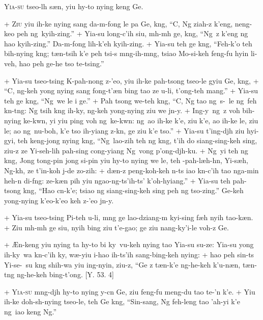 \header
\lettrine{Y}{ia-su} tseo-l\oo h s\ae n, yiu hy\y-to nying keng Ge.
\par
\hspace{1ex}
+	\textsc{Ziu} yiu ih-ke nying sang da-m\oo-fong le pa Ge, k\oo ng, ``C\y, Ng ziah-z k'eng, neng-keo peh ng\oo\ kyih-zing.''
+	Yia-su long-c'ih siu, m\oo h-m\oo h ge, k\oo ng, ``Ng\oo\ z k'eng ng hao kyih-zing.'' Da-m\oo-fong lih-k'eh kyih-zing.
+	Yia-su teh ge k\oo ng, ``Feh-k'o teh bih-nying k\oo ng; t\ae n-tsih k'e peh tsi-s m\oo ng-ih-m\oo ng, tsiao Mo-si-keh feng-fu hyin li-veh, hao peh ge-he tso te-tsing.''
\par
+	Yia-su tseo-tsing K\oo-pah-nong z-'eo, yiu ih-ke pah-tsong tseo-le gyiu Ge, k\oo ng,
+	``C\y, ng\oo-keh y\y ong nying sang fong-t'\ae n bing tao ze u-li, t'ong-teh mang.''
+	Yia-su teh ge k\oo ng, ``Ng\oo\ we le i ge.''
+	Pah tsong we-teh k\oo ng, ``C\y, Ng tao ng\oo\ s\oo-\oo\ le ng\oo\ feh k\e n-t\oo ng: Ng tsih k\oo ng ih-ky\y, ng\oo-keh y\y ong-nying ziu we j\y n-y\y.
+	Ing-y\y\ ng\oo\ z voh bih-nying ke-kw\e n, yi yiu ping voh ng\oo\ ke-kw\e n: ng\oo\ ao ih-ke k'e, ziu k'e, ao ih-ke le, ziu le; ao ng\oo\ nu-boh, k'e tso ih-yiang z-k\e n, ge ziu k'e tso.''
+	Yia-su t'ing-dj\oo h ziu hyi-gyi, teh keng-jong nying k\oo ng, ``Ng\oo\ lao-zih teh ng k\oo ng, t'ih do siang-sing-keh sing, ziu-z ze Yi-seh-lih pah-sing cong-yiang Ng\oo\ vong p'ong-dj\oo h-ku.
+	Ng\oo\ yi teh ng k\oo ng, Jong tong-pin jong si-pin yiu hy\y-to nying we le, teh \OO-pah-l\ae h-h\e n, Yi-s\ae h, Ng\oo-k\oo h, ze t'in-koh j\y-de zo-zih:
+	d\ae n-z peng-koh-keh n-ts iao k\e n-c'ih tao nga-min heh-\e n di-f\oo ng: ze-k\ae n pih yiu ngao-ng\oo-ts'ih-ts' k'oh-hyiang.''
+	Yia-su teh pah-tsong k\oo ng, ``Hao c\y n-k'e; tsiao ng siang-sing-keh sing peh ng tso-zing.'' Ge-keh y\y ong-nying k'eo-k'eo keh z-'eo j\y n-y\y.
\par
+	Yia-su tseo-tsing Pi-teh u-li, m\oo ng ge lao-dziang-m kyi-sing f\ae h nyih tao-k\ae n.
+	Ziu m\oo h-m\oo h ge siu, nyih bing ziu t'e-gao; ge ziu nang-ky'i-le voh-z Ge.
\par
+	\AE n-keng yiu nying ta hy\y-to bi ky\y\ vu-keh nying tao Yia-su su-ze: Yia-su y\y ong ih-ky\y\ wa k\e n-c'ih ky\y, w\ae-yiu i-hao ih-ts'ih sang-bing-keh nying:
+	hao peh sin-ts Yi-se-\oo\ su k\oo ng shih-wa yiu ing-nyin, ziu-z, ``Ge z t\ae n-k'e ng\oo-he-keh k'u-n\ae n, t\ae n-t\oo ng ng\oo-he-keh bing-t'ong. [Y. 53. 4]
\par
+	\textsc{Yia-su} m\oo ng-dj\oo h hy\y-to nying y\y-c\y n Ge, ziu feng-fu meng-du tao te-'\e n k'e.
+	Yiu ih-ke doh-sh\y-nying tseo-le, teh Ge k\oo ng, ``Sin-sang, Ng feh-leng tao 'ah-yi k'e ng\oo\ iao keng Ng.''
